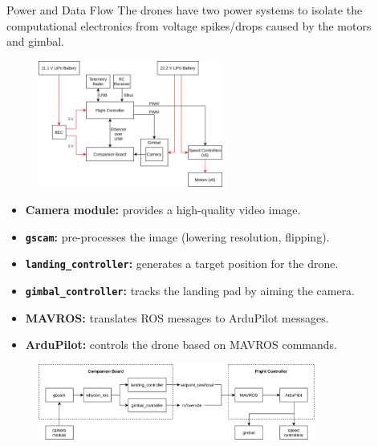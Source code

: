 \documentclass[final, 20pt]{beamer}
\newlength{\sepwidth}
\newlength{\colwidth}
\newcommand{\separatorcolumn}{\begin{column}{\sepwidth}\end{column}}
\begin{document}
\begin{frame}[t]
\begin{columns}[t]
\begin{column}{\colwidth}
\end{column}

\separatorcolumn

\begin{column}{\colwidth}

  \begin{block}{Power and Data Flow}
        The drones have two power systems to isolate the computational electronics from voltage spikes/drops caused by the motors and gimbal.
        \begin{figure}
          \includegraphics[width=0.6\textwidth]{hardware.png}
        \end{figure}

        \vspace{-1.5cm}
        \begin{itemize}
          \item \textbf{Camera module:} provides a high-quality video image.
          \item \textbf{\texttt{gscam}:} pre-processes the image (lowering resolution, flipping).
          \item \textbf{\texttt{landing\_controller}:} generates a target position for the drone.
          \item \textbf{\texttt{gimbal\_controller}:} tracks the landing pad by aiming the camera.
          \item \textbf{MAVROS:} translates ROS messages to ArduPilot messages.
          \item \textbf{ArduPilot:} controls the drone based on MAVROS commands.
        \end{itemize}

        \begin{figure}
            \includegraphics[width=0.9\textwidth]{data_flow.png}
        \end{figure}
  \end{block}


\end{column}
\end{columns}
\end{frame}
\end{document}
